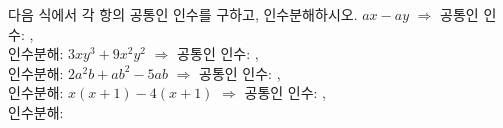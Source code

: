 다음 식에서 각 항의 공통인 인수를 구하고, 인수분해하시오.
 $ax-ay$ $\Rightarrow$ 공통인 인수: \blank[4em],\\ 인수분해: \blank[5em]
 $3xy^3+9x^2y^2$ $\Rightarrow$ 공통인 인수: \blank[4em],\\ 인수분해: \blank[5em]
 $2a^2b+ab^2-5ab$ $\Rightarrow$ 공통인 인수: \blank[4em],\\ 인수분해: \blank[5em]
 $x(x+1)-4(x+1)$ $\Rightarrow$ 공통인 인수: \blank[4em],\\ 인수분해: \blank[5em]
